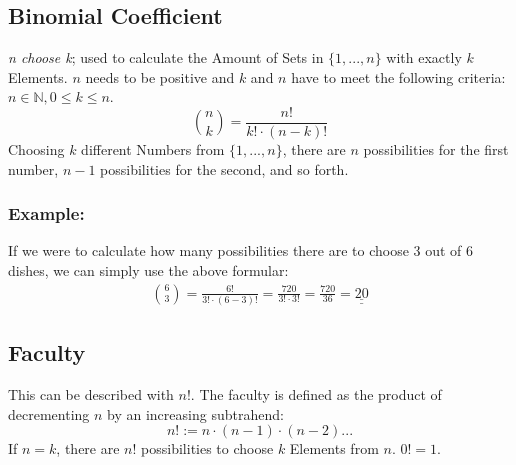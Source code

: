 \documentclass[twoside, a4paper, twocolumn]{article}
\begin{document}
    \subsection{Binomial Coefficient}
    \textit{n choose k}; used to calculate the Amount of Sets in
    $\{1,\textrm{...},n\}$ with exactly $k$ Elements. $n$ needs to be positive
    and $k$ and $n$ have to meet the following criteria: $n \in \mathbb{N}, 0
    \leq k \leq n$.
    \begin{equation}
        \binom{n}{k} = \frac{n!}{k! \cdot (n-k)!}
    \end{equation}
    Choosing $k$ different Numbers from $\{1,\textrm{...},n\}$, there are $n$
    possibilities for the first number, $n-1$ possibilities for the second, and
    so forth. 

    \subsubsection{Example:}
    If we were to calculate how many possibilities there are to choose 3 out of
    6 dishes, we can simply use the above formular:
    \begin{align*}
        \binom{6}{3} = \frac{6!}{3! \cdot (6-3)!} = \frac{720}{3! \cdot 3!} =
        \frac{720}{36} = \underline{\underline{20}}
    \end{align*}


    \subsection{Faculty}
    This can be described with $n!$. The faculty is defined as the
    product of decrementing $n$ by an increasing subtrahend:
    \begin{equation}
        n! := n \cdot (n-1) \cdot (n-2) \textrm{...}
    \end{equation}
    If $n = k$, there are $n!$ possibilities to choose $k$ Elements from $n$.
    $0! = 1$.
\end{document}
